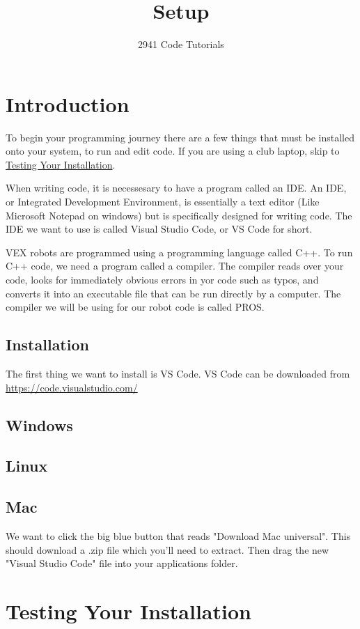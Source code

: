 \documentclass[12pt]{article} %
\title{Setup}
\author{2941 Code Tutorials} %
\begin{document}
\maketitle 
\tableofcontents

\pagebreak

\section{Introduction}

To begin your programming journey there are a few things that must be installed onto your system,
to run and edit code.
If you are using a club laptop, skip to \hyperref[sec:testing]{Testing Your Installation}.

When writing code, it is necessesary to have a program called an IDE.
An IDE, or Integrated Development Environment, is essentially a text editor (Like Microsoft Notepad on windows)
but is specifically designed for writing code.
The IDE we want to use is called Visual Studio Code, or VS Code for short.

VEX robots are programmed using a programming language called C++.
To run C++ code, we need a program called a compiler.
The compiler reads over your code,
looks for immediately obvious errors in yor code such as typos,
and converts it into an executable file that can be run directly by a computer. 
The compiler we will be using for our robot code is called PROS.

\subsection{Installation}

The first thing we want to install is VS Code.
VS Code can be downloaded from \url{https://code.visualstudio.com/}

\subsection*{Windows}

\subsection*{Linux}

\subsection*{Mac}

We want to click the big blue button that reads "Download Mac universal".
This should download a .zip file which you'll need to extract.
Then drag the new "Visual Studio Code" file into your applications folder.

\section{Testing Your Installation}
\label{sec:testing}
\end{document}
